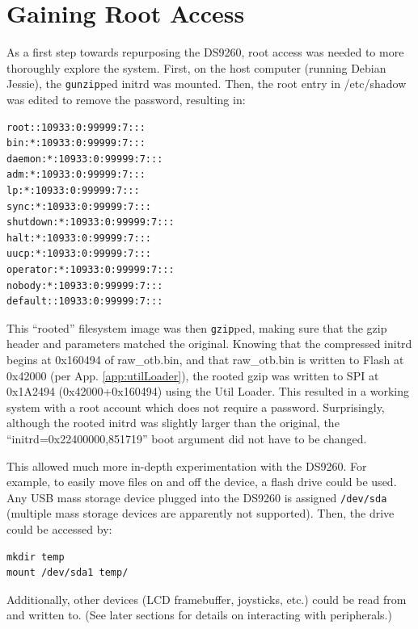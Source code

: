 \documentclass[]{article}
\begin{document}
\section{Gaining Root Access}
\par As a first step towards repurposing the DS9260, root access was needed to more thoroughly explore the system. First, on the host computer (running Debian Jessie), the \texttt{gunzip}ped initrd was mounted. Then, the root entry in /etc/shadow was edited to remove the password, resulting in:
\begin{verbatim}
root::10933:0:99999:7:::
bin:*:10933:0:99999:7:::
daemon:*:10933:0:99999:7:::
adm:*:10933:0:99999:7:::
lp:*:10933:0:99999:7:::
sync:*:10933:0:99999:7:::
shutdown:*:10933:0:99999:7:::
halt:*:10933:0:99999:7:::
uucp:*:10933:0:99999:7:::
operator:*:10933:0:99999:7:::
nobody:*:10933:0:99999:7:::
default::10933:0:99999:7:::
\end{verbatim}
\par This ``rooted'' filesystem image was then \texttt{gzip}ped, making sure that the gzip header and parameters matched the original. Knowing that the compressed initrd begins at 0x160494 of raw\_otb.bin, and that raw\_otb.bin is written to Flash at 0x42000 (per App. \ref{app:utilLoader}), the rooted gzip was written to SPI at 0x1A2494 (0x42000+0x160494) using the Util Loader. This resulted in a working system with a root account which does not require a password. Surprisingly, although the rooted initrd was slightly larger than the original, the ``initrd=0x22400000,851719'' boot argument did not have to be changed. 
\par This allowed much more in-depth experimentation with the DS9260. For example, to easily move files on and off the device, a flash drive could be used. Any USB mass storage device plugged into the DS9260 is assigned \texttt{/dev/sda} (multiple mass storage devices are apparently not supported). Then, the drive could be accessed by:
\begin{verbatim}
mkdir temp
mount /dev/sda1 temp/
\end{verbatim}
Additionally, other devices (LCD framebuffer, joysticks, etc.) could be read from and written to. (See later sections for details on interacting with peripherals.)
\end{document}
